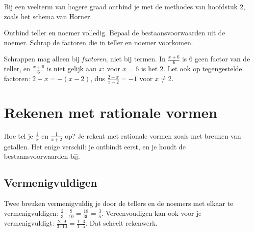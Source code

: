 Bij een veelterm van hogere graad ontbind je met de methodes van hoofdstuk 2, zoals het schema van Horner.


\begin{werkwijze}
Ontbind teller en noemer volledig. Bepaal de bestaansvoorwaarden uit de noemer. Schrap de factoren die in teller en noemer voorkomen.
\end{werkwijze}

Schrappen mag alleen bij \emph{factoren}, niet bij termen. In $\tfrac{x + 6}{6}$ is $6$ geen factor van de teller, en $\tfrac{x + 6}{6}$ is niet gelijk aan $x$: voor $x = 6$ is het $2$. Let ook op tegengestelde factoren: $2 - x = -(x - 2)$, dus $\tfrac{2 - x}{x - 2} = -1$ voor $x \neq 2$.

\begin{oefeningen}
\end{oefeningen}

\section{Rekenen met rationale vormen}

Hoe tel je $\tfrac1x$ en $\tfrac{1}{x + 2}$ op? Je rekent met rationale vormen zoals met breuken van getallen. Het enige verschil: je ontbindt eerst, en je houdt de bestaansvoorwaarden bij.

\subsection{Vermenigvuldigen}

Twee breuken vermenigvuldig je door de tellers en de noemers met elkaar te vermenigvuldigen: $\tfrac23 \cdot \tfrac{9}{10} = \tfrac{18}{30} = \tfrac35$. Vereenvoudigen kan ook voor je vermenigvuldigt: $\tfrac{2 \cdot 9}{3 \cdot 10} = \tfrac{1 \cdot 3}{1 \cdot 5}$. Dat scheelt rekenwerk.

